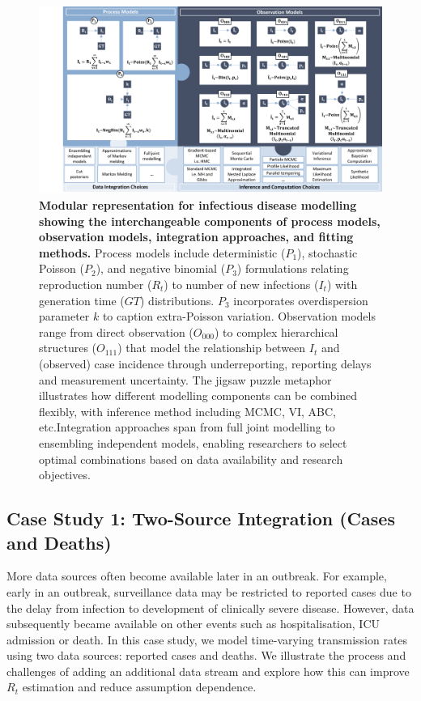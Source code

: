 \documentclass{article}
\begin{document}
 


\begin{figure}[htbp]
    \centering
    \includegraphics[width=\textwidth]{figures/case_study_puzzle_complete.png}
    \caption{\textbf{Modular representation for infectious disease modelling showing the interchangeable components of process models, observation models, integration approaches, and fitting methods.} Process models include deterministic ($P_1$), stochastic Poisson ($P_2$), and negative binomial ($P_3$) formulations relating reproduction number ($R_t$) to number of new infections ($I_t$) with generation time ($GT$) distributions. $P_3$ incorporates overdispersion parameter $k$ to caption extra-Poisson variation. Observation models range from direct observation ($O_{000}$) to complex hierarchical structures ($O_{111}$) that model the relationship between $I_t$ and (observed) case incidence through underreporting, reporting delays and measurement uncertainty. The jigsaw puzzle metaphor illustrates how different modelling components can be combined flexibly, with inference method including MCMC, VI, ABC, etc.Integration approaches span from full joint modelling to ensembling independent models, enabling researchers to select optimal combinations based on data availability and research objectives. }
    \label{fig:case_study_visual}
\end{figure}


\subsection{Case Study 1: Two-Source Integration (Cases and Deaths)}

More data sources often become available later in an outbreak. For example, early in an outbreak, surveillance data may be restricted to reported cases due to the delay from infection to development of clinically severe disease. However, data subsequently became available on other events such as hospitalisation, ICU admission or death. In this case study, we model time-varying transmission rates using two data sources: reported cases and deaths. We illustrate the process and challenges of adding an additional data stream and explore how this can improve $R_t$ estimation and reduce assumption dependence.
\end{document}
